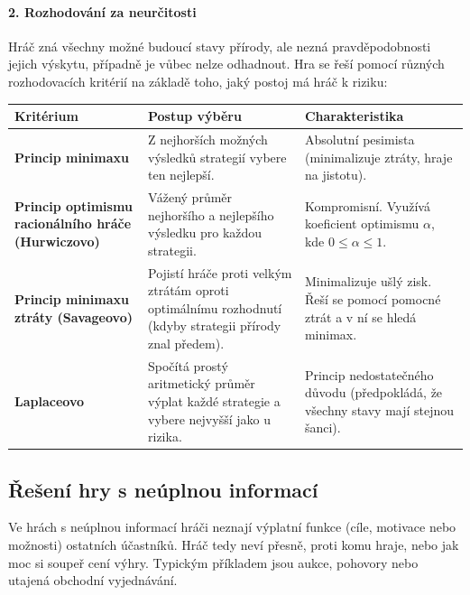 \paragraph*{2. Rozhodování za neurčitosti}
Hráč zná všechny možné budoucí stavy přírody, ale nezná pravděpodobnosti jejich výskytu, případně je vůbec nelze odhadnout. Hra se řeší pomocí různých rozhodovacích kritérií na základě toho, jaký postoj má hráč k riziku:
\newpage
\begin{table}[h]
    \centering
    \renewcommand{\arraystretch}{1.3}
    \begin{tabular}{|p{4cm}|p{6cm}|p{5.5cm}|}
        \hline
        \textbf{Kritérium} & \textbf{Postup výběru} & \textbf{Charakteristika} \\ 
        \hline
        \textbf{Princip minimaxu} & Z nejhorších možných výsledků strategií vybere ten nejlepší. & Absolutní pesimista (minimalizuje ztráty, hraje na jistotu). \\ 
        \hline
        \textbf{Princip optimismu racionálního hráče (Hurwiczovo)} & Vážený průměr nejhoršího a nejlepšího výsledku pro každou strategii. & Kompromisní. Využívá koeficient optimismu $\alpha$, kde $0 \le \alpha \le 1$. \\ 
        \hline
        \textbf{Princip minimaxu ztráty (Savageovo)} & Pojistí hráče proti velkým ztrátám oproti optimálnímu rozhodnutí (kdyby strategii
přírody znal předem). & Minimalizuje ušlý zisk. Řeší se pomocí pomocné ztrát a v ní se hledá minimax. \\ 
        \hline
        \textbf{Laplaceovo} & Spočítá prostý aritmetický průměr výplat každé strategie a vybere nejvyšší jako u rizika. & Princip nedostatečného důvodu (předpokládá, že všechny stavy mají stejnou šanci). \\ 
        \hline
    \end{tabular}
\end{table}

\subsection{Řešení hry s neúplnou informací}
Ve hrách s neúplnou informací hráči neznají výplatní funkce (cíle, motivace nebo možnosti) ostatních účastníků. Hráč tedy neví přesně, proti komu hraje, nebo jak moc si soupeř cení výhry. Typickým příkladem jsou aukce, pohovory nebo utajená obchodní vyjednávání.

